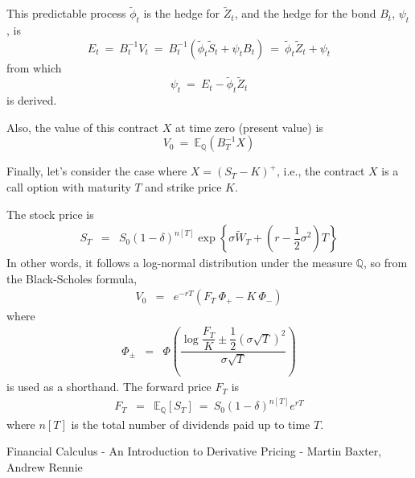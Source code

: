 \documentclass[uplatex,a4j,12pt,dvipdfmx]{jsarticle}
\begin{document}
This predictable process $\tilde{\phi}_{t}$ is the hedge for $\tilde{Z}_{t}$, and the hedge for the bond $B_{t}$, $\psi_{t}$, is
$$
	E_{t}
	\ = \
	B^{-1}_{t} V_{t}
	\ = \
	B^{-1}_{t} ( \tilde{\phi}_{t} \tilde{S}_{t} + \psi_{t} B_{t} )
	\ = \
	\tilde{\phi}_{t} \tilde{Z}_{t} + \psi_{t}
$$
from which
$$
	\psi_{t}
	\ = \
	E_{t} - \tilde{\phi}_{t} \tilde{Z}_{t}
$$
is derived.

Also, the value of this contract $X$ at time zero (present value) is
$$
	V_{0}
	\ = \
	\mathbb{E}_{\mathbb{Q}}(B^{-1}_{T} X )
$$

Finally, let's consider the case where $X=(S_{T}-K)^{+}$, i.e., the contract $X$ is a call option with maturity $T$ and strike price $K$.

The stock price is
%
%
\begin{eqnarray*}
	S_{T}
	&=&
	S_{0}
	(1-\delta)^{n[T]}
	\exp
	\left\{
	\sigma \tilde{W}_{T}
	+
	\left(
	r
	-
	\dfrac{1}{2}
	\sigma^{2}
	\right)
	T
	\right\}
\end{eqnarray*}
%
%
In other words, it follows a log-normal distribution under the measure $\mathbb{Q}$, so from the Black-Scholes formula,
%
%
\begin{eqnarray*}
	V_{0}
	&=&
	e^{-rT} (F_{T}
	\ \! \Phi_{+}
	-
	K
	\ \! \Phi_{-})
\end{eqnarray*}
%
%
where
%
%
\begin{eqnarray*}
	\Phi_{\pm}
	&=&
	\Phi
	\left(
	\dfrac{
		\log \dfrac{F_{T}}{K} \pm \dfrac{1}{2} ( \sigma \sqrt{T} )^{2}
	}
	{\sigma \sqrt{T}}
	\right)
\end{eqnarray*}
%
%
is used as a shorthand. The forward price $F_{T}$ is
%
%
\begin{eqnarray*}
	F_{T}
	&=&
	\mathbb{E}_{\mathbb{Q}}[S_T]
	\ = \
	S_{0}
	(1-\delta)^{n[T]} e^{rT}
\end{eqnarray*}
%
%
where $n[T]$ is the total number of dividends paid up to time $T$.


\begin{thebibliography}{9}
	Financial Calculus - An Introduction to Derivative Pricing - Martin Baxter, Andrew Rennie
\end{thebibliography}
\end{document}
